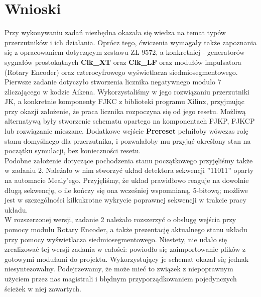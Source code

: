 \documentclass[a4paper,12pt]{extarticle}  %
\begin{document}
\section{Wnioski}

Przy wykonywaniu zadań niezbędna okazała się wiedza na temat typów przerzutników i ich działania. Oprócz tego, ćwiczenia wymagały także zapoznania się z opracowaniem dotyczącym zestawu ZL-9572, a konkretniej - generatorów sygnałów prostokątnych \textbf{Clk\_XT} oraz \textbf{Clk\_LF} oraz modułów impulsatora (Rotary Encoder) oraz czterocyfrowego wyświetlacza siedmiosegmentowego. \\
Pierwsze zadanie dotyczyło stworzenia licznika negatywnego modulo 7 zliczającego w kodzie Aikena. Wykorzystaliśmy w jego rozwiązaniu przerzutniki JK, a konkretnie komponenty FJKC z biblioteki programu Xilinx, przyjmując przy okazji założenie, że praca licznika rozpoczyna się od jego resetu. Możliwą alternatywą były stworzenie schematu opartego na komponentach FJKP, FJKCP lub rozwiązanie mieszane. Dodatkowe wejście \textbf{Prereset} pełniłoby wówczas rolę stanu domyślnego dla przerzutnika, i pozwalałoby mu przyjąć określony stan na początku symulacji, bez konieczności resetu. \\
Podobne założenie dotyczące pochodzenia stanu początkowego przyjęliśmy także w zadaniu 2. Należało w nim stworzyć układ detektora sekwencji ''11011'' oparty na automacie Mealy'ego. Przyjęliśmy, że układ prawidłowo reaguje na dowolnie długą sekwencję, o ile kończy się ona wcześniej wspomnianą, 5-bitową; możliwe jest w szczególności kilkukrotne wykrycie poprawnej sekwencji w trakcie pracy układu. \\
W rozszerzonej wersji, zadanie 2 należało rozszerzyć o obsługę wejścia przy pomocy modułu Rotary Encoder, a także prezentację aktualnego stanu układu przy pomocy wyświetlacza siedmiosegmentowego. Niestety, nie udało się zrealizować tej wersji zadania w całości: powiodło się zaimportowanie plików z gotowymi modułami do projektu. Wykorzystujący je schemat okazał się jednak niesyntezowalny. Podejrzewamy, że może mieć to związek z niepoprawnym użyciem przez nas magistrali i błędnym przyporządkowaniem pojedynczych ścieżek w niej zawartych. 
\end{document}
